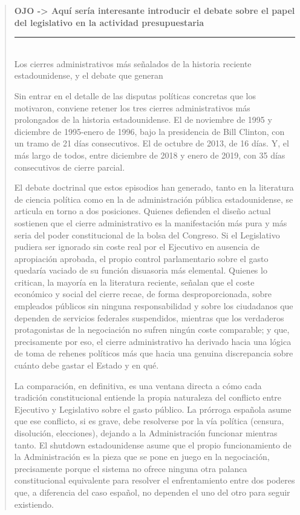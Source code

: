 \documentclass[10pt,a4paper]{article}
\newenvironment{specialblock}[1]{%
      \begin{quote} %
      \small %
      \noindent\textbf{#1}\\[-0.3em] %
      \rule{\linewidth}{0.4pt}\\[0.6em]}{
      \end{quote}}
\begin{document}
\begin{specialblock}{\textbf{OJO ->} Aquí sería interesante introducir el debate sobre el papel del legislativo en la actividad presupuestaria}
    Los cierres administrativos más señalados de la historia reciente estadounidense, y el debate que generan
    
    Sin entrar en el detalle de las disputas políticas concretas que los motivaron, conviene retener los tres cierres administrativos más prolongados de la historia estadounidense. El de noviembre de 1995 y diciembre de 1995-enero de 1996, bajo la presidencia de Bill Clinton, con un tramo de 21 días consecutivos. El de octubre de 2013, de 16 días. Y, el más largo de todos, entre diciembre de 2018 y enero de 2019, con 35 días consecutivos de cierre parcial.
    
    El debate doctrinal que estos episodios han generado, tanto en la literatura de ciencia política como en la de administración pública estadounidense, se articula en torno a dos posiciones. Quienes defienden el diseño actual sostienen que el cierre administrativo es la manifestación más pura y más seria del poder constitucional de la bolsa del Congreso. Si el Legislativo pudiera ser ignorado sin coste real por el Ejecutivo en ausencia de apropiación aprobada, el propio control parlamentario sobre el gasto quedaría vaciado de su función disuasoria más elemental. Quienes lo critican, la mayoría en la literatura reciente, señalan que el coste económico y social del cierre recae, de forma desproporcionada, sobre empleados públicos sin ninguna responsabilidad y sobre los ciudadanos que dependen de servicios federales suspendidos, mientras que los verdaderos protagonistas de la negociación no sufren ningún coste comparable; y que, precisamente por eso, el cierre administrativo ha derivado hacia una lógica de toma de rehenes políticos más que hacia una genuina discrepancia sobre cuánto debe gastar el Estado y en qué.
    
    La comparación, en definitiva, es una ventana directa a cómo cada tradición constitucional entiende la propia naturaleza del conflicto entre Ejecutivo y Legislativo sobre el gasto público. La prórroga española asume que ese conflicto, si es grave, debe resolverse por la vía política (censura, disolución, elecciones), dejando a la Administración funcionar mientras tanto. El shutdown estadounidense asume que el propio funcionamiento de la Administración es la pieza que se pone en juego en la negociación, precisamente porque el sistema no ofrece ninguna otra palanca constitucional equivalente para resolver el enfrentamiento entre dos poderes que, a diferencia del caso español, no dependen el uno del otro para seguir existiendo.
\end{specialblock}
\end{document}
